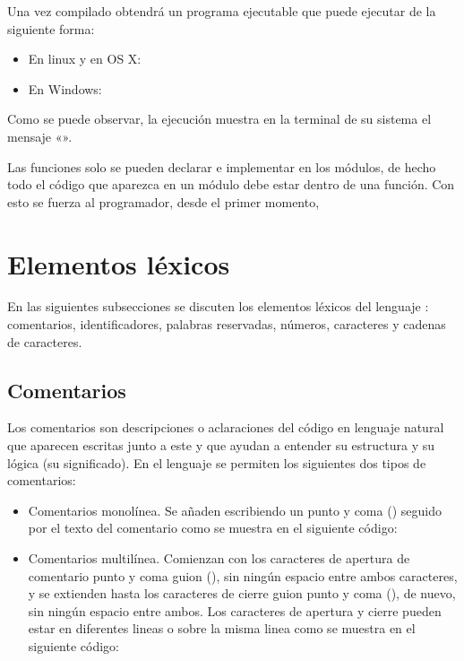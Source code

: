 		Una vez compilado obtendrá un programa ejecutable que puede ejecutar de la siguiente forma:
		\begin{itemize}
			\item En linux y en OS X:

			\item En Windows:
		\end{itemize}

		Como se puede observar, la ejecución muestra en la terminal de su sistema el mensaje «».

		Las funciones solo se pueden declarar e implementar en los módulos, de hecho todo el código que aparezca en un módulo debe estar dentro de una función. Con esto se fuerza al programador, desde el primer momento,  



	\section{Elementos léxicos}

		En las siguientes subsecciones se discuten los elementos léxicos del lenguaje \Set: comentarios, identificadores, palabras reservadas, números, caracteres y cadenas de caracteres.



		\subsection{Comentarios}

			Los comentarios son descripciones o aclaraciones del código en lenguaje natural que aparecen escritas junto a este y que ayudan a entender su estructura y su lógica (su significado). En el lenguaje \Set se permiten los siguientes dos tipos de comentarios:
			\begin{itemize}
				\item Comentarios monolínea. Se añaden escribiendo un punto y coma (\sbr{\cod{;}}) seguido por el texto del comentario como se muestra en el siguiente código:
				

				\item Comentarios multilínea. Comienzan con los caracteres de apertura de comentario punto y coma guion (\sbr{\cod{;-}}), sin ningún espacio entre ambos caracteres, y se extienden hasta los caracteres de cierre guion punto y coma (\sbr{\cod{-;}}), de nuevo, sin ningún espacio entre ambos. Los caracteres de apertura y cierre pueden estar en diferentes lineas o sobre la misma linea como se muestra en el siguiente código:
				
			\end{itemize}

